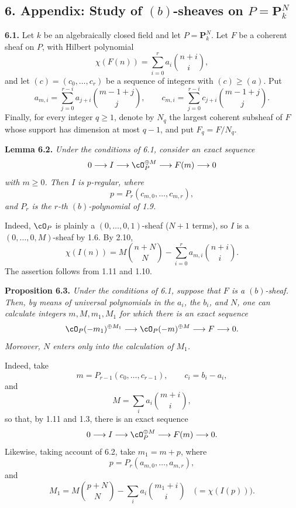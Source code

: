 
\subsection*{6. Appendix: Study of $(b)$-sheaves on $P=\mathbf P^N_k$}

\textbf{6.1.} Let $k$ be an algebraically closed field and let $P=\mathbf P^N_k$. Let $F$ be a coherent sheaf on $P$, with Hilbert polynomial
\[
  \chi(F(n))=\sum_{i=0}^{r}a_i\binom{n+i}{i},
\]
and let $(c)=(c_0,\ldots,c_r)$ be a sequence of integers with $(c)\geq(a)$. Put
\[
  a_{m,i}=\sum_{j=0}^{r-i}a_{j+i}\binom{m-1+j}{j},
  \qquad
  c_{m,i}=\sum_{j=0}^{r-i}c_{j+i}\binom{m-1+j}{j}.
\]
Finally, for every integer $q\geq1$, denote by $N_q$ the largest coherent subsheaf of $F$ whose support has dimension at most $q-1$, and put $F_q=F/N_q$.

\textbf{Lemma 6.2.} \emph{Under the conditions of 6.1, consider an exact sequence
\[
  0\longrightarrow I\longrightarrow\cO_P^{\oplus M}
  \longrightarrow F(m)\longrightarrow0
\]
with $m\geq0$. Then $I$ is $p$-regular, where
\[
  p=P_r(c_{m,0},\ldots,c_{m,r}),
\]
and $P_r$ is the $r$-th $(b)$-polynomial of 1.9.}

Indeed, $\cO_P$ is plainly a $(0,\ldots,0,1)$-sheaf ($N+1$ terms), so $I$ is a $(0,\ldots,0,M)$-sheaf by 1.6. By 2.10,
\[
  \chi(I(n))=M\binom{n+N}{N}
  -\sum_{i=0}^{r}a_{m,i}\binom{n+i}{i}.
\]
The assertion follows from 1.11 and 1.10.

\textbf{Proposition 6.3.} \emph{Under the conditions of 6.1, suppose that $F$ is a $(b)$-sheaf. Then, by means of universal polynomials in the $a_i$, the $b_i$, and $N$, one can calculate integers $m,M,m_1,M_1$ for which there is an exact sequence
\[
  \cO_P(-m_1)^{\oplus M_1}\longrightarrow
  \cO_P(-m)^{\oplus M}\longrightarrow F\longrightarrow0.
\]
Moreover, $N$ enters only into the calculation of $M_1$.}

Indeed, take
\[
  m=P_{r-1}(c_0,\ldots,c_{r-1}),
  \qquad c_i=b_i-a_i,
\]
and
\[
  M=\sum_i a_i\binom{m+i}{i},
\]
so that, by 1.11 and 1.3, there is an exact sequence
\[
  0\longrightarrow I\longrightarrow\cO_P^{\oplus M}
  \longrightarrow F(m)\longrightarrow0.
\]
Likewise, taking account of 6.2, take $m_1=m+p$, where
\[
  p=P_r(a_{m,0},\ldots,a_{m,r}),
\]
and
\[
  M_1=M\binom{p+N}{N}-\sum_i a_i\binom{m_1+i}{i}
  \quad\bigl(=\chi(I(p))\bigr).
\]

